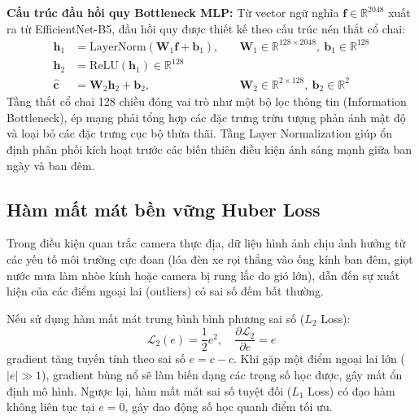 \textbf{Cấu trúc đầu hồi quy Bottleneck MLP:}
Từ vector ngữ nghĩa $\mathbf{f} \in \mathbb{R}^{2048}$ xuất ra từ EfficientNet-B5, đầu hồi quy được thiết kế theo cấu trúc nén thắt cổ chai:
\begin{align}
    \mathbf{h}_1 &= \text{LayerNorm}(\mathbf{W}_1 \mathbf{f} + \mathbf{b}_1), \quad &\mathbf{W}_1 \in \mathbb{R}^{128 \times 2048}, \ \mathbf{b}_1 \in \mathbb{R}^{128} \\
    \mathbf{h}_2 &= \text{ReLU}(\mathbf{h}_1) \in \mathbb{R}^{128} \\
    \hat{\mathbf{c}} &= \mathbf{W}_2 \mathbf{h}_2 + \mathbf{b}_2, \quad &\mathbf{W}_2 \in \mathbb{R}^{2 \times 128}, \ \mathbf{b}_2 \in \mathbb{R}^2
\end{align}
Tầng thắt cổ chai 128 chiều đóng vai trò như một bộ lọc thông tin (Information Bottleneck), ép mạng phải tổng hợp các đặc trưng trừu tượng phản ánh mật độ và loại bỏ các đặc trưng cục bộ thừa thãi. Tầng Layer Normalization giúp ổn định phân phối kích hoạt trước các biến thiên điều kiện ánh sáng mạnh giữa ban ngày và ban đêm.

\subsection{Hàm mất mát bền vững Huber Loss}
\label{sec:huber_loss}
Trong điều kiện quan trắc camera thực địa, dữ liệu hình ảnh chịu ảnh hưởng từ các yếu tố môi trường cực đoan (lóa đèn xe rọi thẳng vào ống kính ban đêm, giọt nước mưa làm nhòe kính hoặc camera bị rung lắc do gió lớn), dẫn đến sự xuất hiện của các điểm ngoại lai (outliers) có sai số đếm bất thường.

Nếu sử dụng hàm mất mát trung bình bình phương sai số ($L_2$ Loss):
\begin{equation}
    \mathcal{L}_2(e) = \frac{1}{2} e^2, \quad \frac{\partial \mathcal{L}_2}{\partial e} = e
\end{equation}
gradient tăng tuyến tính theo sai số $e = c - \hat{c}$. Khi gặp một điểm ngoại lai lớn ($|e| \gg 1$), gradient bùng nổ sẽ làm biến dạng các trọng số học được, gây mất ổn định mô hình. Ngược lại, hàm mất mát sai số tuyệt đối ($L_1$ Loss) có đạo hàm không liên tục tại $e=0$, gây dao động số học quanh điểm tối ưu.

